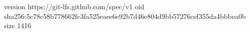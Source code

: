 version https://git-lfs.github.com/spec/v1
oid sha256:5c78c58b778662fc3fa525eaee6e92b7d46e804d9bb57276cef355da4bbbea0b
size 1416
